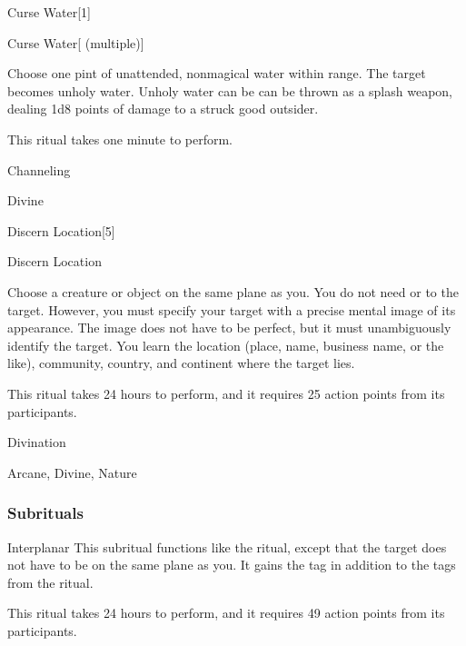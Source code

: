 \begin{spellsection}{Curse Water}[1]


\begin{ability}{Curse Water}[ (multiple)]

Choose one pint of unattended, nonmagical water within \rngclose range.
The target becomes unholy water.
Unholy water can be can be thrown as a splash weapon, dealing 1d8 points of damage to a struck good outsider.

This ritual takes one minute to perform.

\end{ability}




 Channeling

 Divine
\end{spellsection}


\begin{spellsection}{Discern Location}[5]


\begin{ability}{Discern Location}

Choose a creature or object on the same plane as you.
You do not need  or  to the target.
However, you must specify your target with a precise mental image of its appearance.
The image does not have to be perfect, but it must unambiguously identify the target.
You learn the location (place, name, business name, or the like), community, country, and continent where the target lies.

This ritual takes 24 hours to perform, and it requires 25 action points from its participants.

\end{ability}




 Divination

 Arcane, Divine, Nature
\end{spellsection}


\subsubsection{Subrituals}


\begin{ability}[\nth{7}]{Interplanar}
This subritual functions like the  ritual, except that the target does not have to be on the same plane as you.
It gains the  tag in addition to the tags from the  ritual.

This ritual takes 24 hours to perform, and it requires 49 action points from its participants.
\end{ability}
\vspace{0.25em}


